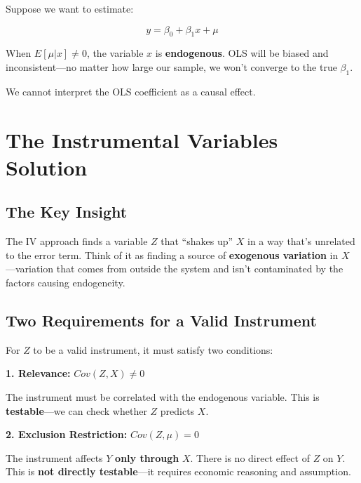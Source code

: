 \documentclass[
  letterpaper,
  DIV=11,
  numbers=noendperiod]{scrreprt}
\begin{document}
Suppose we want to estimate:

\[
y = \beta_0 + \beta_1 x + \mu
\]

When \(E[\mu | x] \neq 0\), the variable \(x\) is \textbf{endogenous}.
OLS will be biased and inconsistent---no matter how large our sample, we
won't converge to the true \(\beta_1\).

We cannot interpret the OLS coefficient as a causal effect.

\section{The Instrumental Variables
Solution}\label{the-instrumental-variables-solution}

\subsection{The Key Insight}\label{the-key-insight-1}

The IV approach finds a variable \(Z\) that ``shakes up'' \(X\) in a way
that's unrelated to the error term. Think of it as finding a source of
\textbf{exogenous variation} in \(X\)---variation that comes from
outside the system and isn't contaminated by the factors causing
endogeneity.

\subsection{Two Requirements for a Valid
Instrument}\label{two-requirements-for-a-valid-instrument}

For \(Z\) to be a valid instrument, it must satisfy two conditions:

\begin{tcolorbox}[enhanced jigsaw, arc=.35mm, bottomrule=.15mm, bottomtitle=1mm, breakable, colback=white, colbacktitle=quarto-callout-important-color!10!white, colframe=quarto-callout-important-color-frame, coltitle=black, left=2mm, leftrule=.75mm, opacityback=0, opacitybacktitle=0.6, rightrule=.15mm, title=\textcolor{quarto-callout-important-color}{\faExclamation}\hspace{0.5em}{The Two IV Assumptions}, titlerule=0mm, toprule=.15mm, toptitle=1mm]

\textbf{1. Relevance:} \(Cov(Z, X) \neq 0\)

The instrument must be correlated with the endogenous variable. This is
\textbf{testable}---we can check whether \(Z\) predicts \(X\).

\textbf{2. Exclusion Restriction:} \(Cov(Z, \mu) = 0\)

The instrument affects \(Y\) \textbf{only through} \(X\). There is no
direct effect of \(Z\) on \(Y\). This is \textbf{not directly
testable}---it requires economic reasoning and assumption.

\end{tcolorbox}
\end{document}
